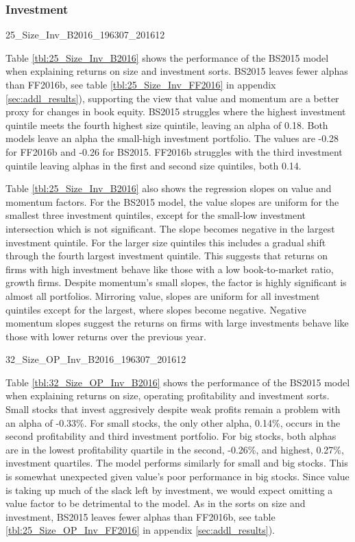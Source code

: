
\subsubsection{Investment}

{25_Size_Inv_B2016_196307_201612}

Table \ref{tbl:25_Size_Inv_B2016} shows the performance of the BS2015
model when  explaining returns on size and investment sorts. BS2015 leaves fewer alphas
than FF2016b, see table \ref{tbl:25_Size_Inv_FF2016} in appendix \ref{sec:addl_results}),
supporting the view that value and momentum are a better proxy for changes in book equity.
BS2015 struggles where the highest investment quintile meets the fourth highest size
quintile, leaving an alpha of 0.18. Both models leave an alpha the small-high investment
portfolio. The values are -0.28 for FF2016b and -0.26 for BS2015. FF2016b struggles with
the third investment quintile leaving alphas in the first and second  size quintiles, both
0.14.

Table \ref{tbl:25_Size_Inv_B2016} also shows the regression slopes on value and momentum
factors. For the BS2015 model, the value slopes are uniform for the smallest three
investment  quintiles, except for the small-low investment intersection which is not
significant. The slope becomes negative in the largest investment quintile. For the larger
size quintiles this includes a gradual shift through the fourth largest investment
quintile. This suggests that returns on firms with high investment behave like those with
a low  book-to-market ratio, growth firms. Despite momentum's small slopes, the factor is
highly significant is almost all portfolios. Mirroring value, slopes are uniform for all
investment quintiles except for the largest, where  slopes become negative. Negative
momentum slopes suggest the returns on firms with large investments behave like those with
lower returns over the previous year.

\begin{landscape}
{32_Size_OP_Inv_B2016_196307_201612}
\end{landscape}

Table \ref{tbl:32_Size_OP_Inv_B2016} shows the performance of the BS2015 model when
explaining returns on size, operating profitability and investment sorts. Small stocks
that invest aggresively despite weak profits remain a problem with an alpha of -0.33\%.
For small stocks, the only other alpha, 0.14\%, occurs in the second profitability and
third investment portfolio. For big stocks, both alphas are in the lowest profitability
quartile in the second, -0.26\%, and highest, 0.27\%, investment quartiles. The model
performs similarly for small and big stocks. This is somewhat unexpected given value's
poor performance in big stocks. Since value is taking up much of the slack left by
investment, we would expect omitting a value factor to be detrimental to the model. As in
the sorts on size and investment, BS2015 leaves fewer alphas than FF2016b, see table
\ref{tbl:25_Size_OP_Inv_FF2016} in appendix \ref{sec:addl_results}).


